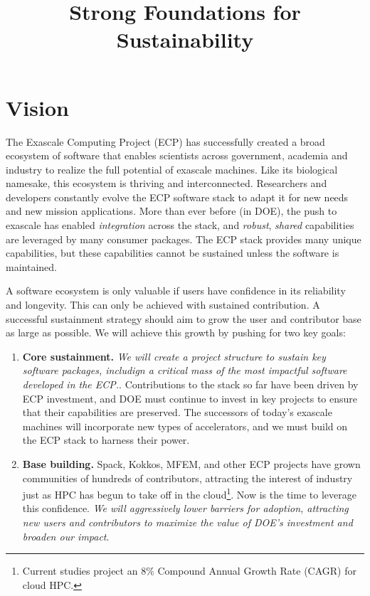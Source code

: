 \documentclass[11pt]{article}
\title{\vspace{-3em}\sf\huge\color{secblue}%
Strong Foundations for Sustainability}
\date{\vspace{-6em}}
\begin{document}
\setcounter{page}{1}

\maketitle

\section{Vision}

The Exascale Computing Project (ECP) has successfully created a broad ecosystem of
software that enables scientists across government, academia and industry to realize the
full potential of exascale machines. Like its biological namesake, this ecosystem is
thriving and interconnected. Researchers and developers constantly evolve the ECP
software stack to adapt it for new needs and new mission applications. More than ever
before (in DOE), the push to exascale has enabled {\it integration} across the stack,
and {\it robust}, {\it shared} capabilities are leveraged by many consumer packages. The
ECP stack provides many unique capabilities, but these capabilities cannot be sustained
unless the software is maintained.

A software ecosystem is only valuable if users have confidence in its reliability and
longevity. This can only be achieved with sustained contribution. A successful
sustainment strategy should aim to grow the user and contributor base as large as
possible. We will achieve this growth by pushing for two key goals:

\begin{enumerate}
\item {\bf Core sustainment.} {\it We will create a project structure to sustain key
  software packages, includign a critical mass of the most impactful software developed in the ECP.}.
  Contributions to the stack so far have been driven by ECP
  investment, and DOE must continue to invest in key projects to ensure that their
  capabilities are preserved. The successors of today's exascale machines will
  incorporate new types of accelerators, and we must build on the ECP stack to harness
  their power.
\item {\bf Base building.} Spack, Kokkos, MFEM, and other ECP projects have grown
  communities of hundreds of contributors, attracting the interest of industry just as
  HPC has begun to take off in the cloud\footnote{Current studies project an 8\%
  Compound Annual Growth Rate (CAGR) for cloud HPC.}. Now is the time to leverage this
  confidence. {\it We will aggressively lower barriers for adoption, attracting new
    users and contributors to maximize the value of DOE's investment and broaden our
    impact}.
\end{enumerate}
\end{document}
